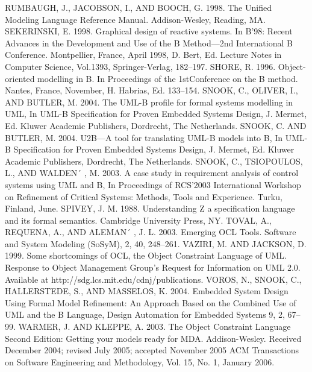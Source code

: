 RUMBAUGH, J., JACOBSON, I., AND BOOCH, G. 1998. The Unified Modeling Language Reference Manual. Addison-Wesley, Reading, MA.
SEKERINSKI, E. 1998. Graphical design of reactive systems. In B’98: Recent Advances in the Development and Use of the B Method—2nd International B Conference. Montpellier, France, April
1998, D. Bert, Ed. Lecture Notes in Computer Science, Vol.1393, Springer-Verlag, 182–197.
SHORE, R. 1996. Object-oriented modelling in B. In Proceedings of the 1stConference on the B
method. Nantes, France, November, H. Habrias, Ed. 133–154.
SNOOK, C., OLIVER, I., AND BUTLER, M. 2004. The UML-B profile for formal systems modelling in
UML, In UML-B Specification for Proven Embedded Systems Design, J. Mermet, Ed. Kluwer
Academic Publishers, Dordrecht, The Netherlands.
SNOOK, C. AND BUTLER, M. 2004. U2B—A tool for translating UML-B models into B, In UML-B
Specification for Proven Embedded Systems Design, J. Mermet, Ed. Kluwer Academic Publishers,
Dordrecht, The Netherlands.
SNOOK, C., TSIOPOULOS, L., AND WALDEN´ , M. 2003. A case study in requirement analysis of control
systems using UML and B, In Proceedings of RCS’2003 International Workshop on Refinement
of Critical Systems: Methods, Tools and Experience. Turku, Finland, June.
SPIVEY, J. M. 1988. Understanding Z a specification language and its formal semantics. Cambridge University Press, NY.
TOVAL, A., REQUENA, A., AND ALEMAN´ , J. L. 2003. Emerging OCL Tools. Software and System
Modeling (SoSyM), 2, 40, 248–261.
VAZIRI, M. AND JACKSON, D. 1999. Some shortcomings of OCL, the Object Constraint Language of
UML. Response to Object Management Group’s Request for Information on UML 2.0. Available
at http://sdg.lcs.mit.edu/cdnj/publications.
VOROS, N., SNOOK, C., HALLERSTEDE, S., AND MASSELOS, K. 2004. Embedded System Design Using
Formal Model Refinement: An Approach Based on the Combined Use of UML and the B Language,
Design Automation for Embedded Systems 9, 2, 67–99.
WARMER, J. AND KLEPPE, A. 2003. The Object Constraint Language Second Edition: Getting your
models ready for MDA. Addison-Wesley.
Received December 2004; revised July 2005; accepted November 2005
ACM Transactions on Software Engineering and Methodology, Vol. 15, No. 1, January 2006.